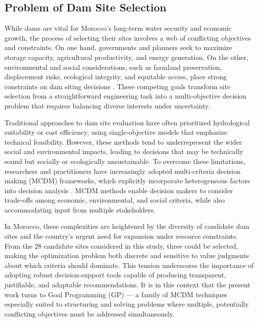 \subsection{Problem of Dam Site Selection}
While dams are vital for Morocco’s long‑term water security and economic growth, the process of selecting their sites involves a web of conflicting objectives and constraints. On one hand, governments and planners seek to maximize storage capacity, agricultural productivity, and energy generation. On the other, environmental and social considerations, such as farmland preservation, displacement risks, ecological integrity, and equitable access, place strong constraints on dam siting decisions \cite{Wang2021,Zerdeb2025}. These competing goals transform site selection from a straightforward engineering task into a multi‑objective decision problem that requires balancing diverse interests under uncertainty.

Traditional approaches to dam site evaluation have often prioritized hydrological suitability or cost efficiency, using single‑objective models that emphasize technical feasibility. However, these methods tend to underrepresent the wider social and environmental impacts, leading to decisions that may be technically sound but socially or ecologically unsustainable. To overcome these limitations, researchers and practitioners have increasingly adopted multi‑criteria decision making (MCDM) frameworks, which explicitly incorporate heterogeneous factors into decision analysis \cite{Wang2021,Hagos2022}. MCDM methods enable decision makers to consider trade‑offs among economic, environmental, and social criteria, while also accommodating input from multiple stakeholders.

In Morocco, these complexities are heightened by the diversity of candidate dam sites and the country’s urgent need for expansion under resource constraints. From the 28 candidate sites considered in this study, three could be selected, making the optimization problem both discrete and sensitive to value judgments about which criteria should dominate. This tension underscores the importance of adopting robust decision-support tools capable of producing transparent, justifiable, and adaptable recommendations. It is in this context that the present work turns to Goal Programming (GP) — a family of MCDM techniques especially suited to structuring and solving problems where multiple, potentially conflicting objectives must be addressed simultaneously.

